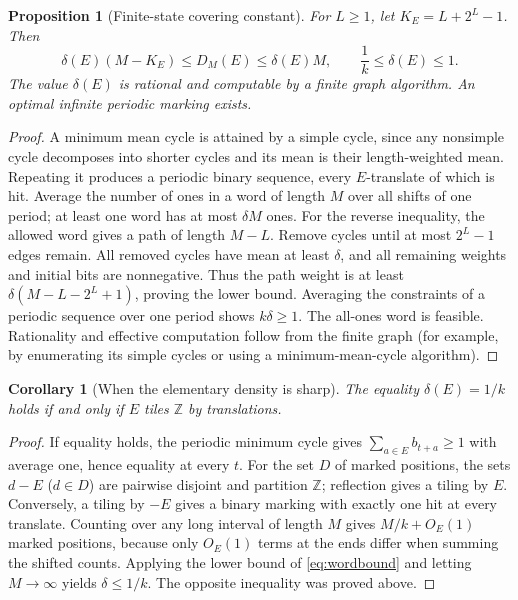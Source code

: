\documentclass[11pt]{article}
\newtheorem{proposition}[theorem]{Proposition}
\newtheorem{corollary}[theorem]{Corollary}
\theoremstyle{definition}
\newcommand{\Z}{\mathbb Z}
\begin{document}
\begin{proposition}[Finite-state covering constant]\label{prop:mean}
For $L\ge1$, let $K_E=L+2^L-1$. Then
\begin{equation}\label{eq:wordbound}
 \delta(E)(M-K_E)\le D_M(E)\le\delta(E)M,
 \qquad \frac1k\le\delta(E)\le1.
\end{equation}
The value $\delta(E)$ is rational and computable by a finite graph algorithm. An optimal infinite periodic marking exists.
\end{proposition}
\begin{proof}
A minimum mean cycle is attained by a simple cycle, since any nonsimple cycle decomposes into shorter cycles and its mean is their length-weighted mean. Repeating it produces a periodic binary sequence, every $E$-translate of which is hit. Average the number of ones in a word of length $M$ over all shifts of one period; at least one word has at most $\delta M$ ones. For the reverse inequality, the allowed word gives a path of length $M-L$. Remove cycles until at most $2^L-1$ edges remain. All removed cycles have mean at least $\delta$, and all remaining weights and initial bits are nonnegative. Thus the path weight is at least $\delta(M-L-2^L+1)$, proving the lower bound. Averaging the constraints of a periodic sequence over one period shows $k\delta\ge1$. The all-ones word is feasible. Rationality and effective computation follow from the finite graph (for example, by enumerating its simple cycles or using a minimum-mean-cycle algorithm).
\end{proof}

\begin{corollary}[When the elementary density is sharp]\label{cor:tile}
The equality $\delta(E)=1/k$ holds if and only if $E$ tiles $\Z$ by translations.
\end{corollary}
\begin{proof}
If equality holds, the periodic minimum cycle gives $\sum_{a\in E}b_{t+a}\ge1$ with average one, hence equality at every $t$. For the set $D$ of marked positions, the sets $d-E$ ($d\in D$) are pairwise disjoint and partition $\Z$; reflection gives a tiling by $E$. Conversely, a tiling by $-E$ gives a binary marking with exactly one hit at every translate. Counting over any long interval of length $M$ gives $M/k+O_E(1)$ marked positions, because only $O_E(1)$ terms at the ends differ when summing the shifted counts. Applying the lower bound of \eqref{eq:wordbound} and letting $M\to\infty$ yields $\delta\le1/k$. The opposite inequality was proved above.
\end{proof}
\end{document}
